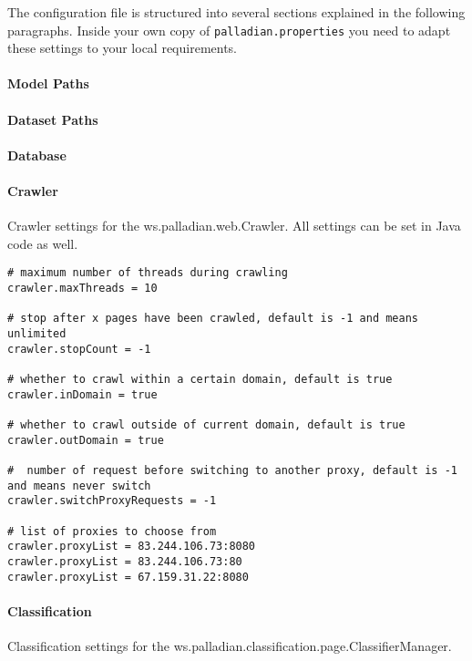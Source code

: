 The configuration file is structured into several sections explained in the following paragraphs. Inside your own copy of \texttt{palladian.properties} you need to adapt these settings to your local requirements.

\paragraph{Model Paths}
\label{par:modelpaths}

\paragraph{Dataset Paths}
\label{par:datasetpaths}

\paragraph{Database}
\label{par:database}

\paragraph{Crawler}
\label{sec:crawler.conf}
Crawler settings for the ws.palladian.web.Crawler. All settings can be set in Java code as well.

\begin{verbatim}
# maximum number of threads during crawling
crawler.maxThreads = 10

# stop after x pages have been crawled, default is -1 and means unlimited
crawler.stopCount = -1

# whether to crawl within a certain domain, default is true
crawler.inDomain = true
	
# whether to crawl outside of current domain, default is true
crawler.outDomain = true

#  number of request before switching to another proxy, default is -1 and means never switch
crawler.switchProxyRequests = -1
	
# list of proxies to choose from
crawler.proxyList = 83.244.106.73:8080
crawler.proxyList = 83.244.106.73:80
crawler.proxyList = 67.159.31.22:8080
\end{verbatim}

\paragraph{Classification}
\label{sec:classification.conf}
Classification settings for the ws.palladian.classification.page.ClassifierManager.

